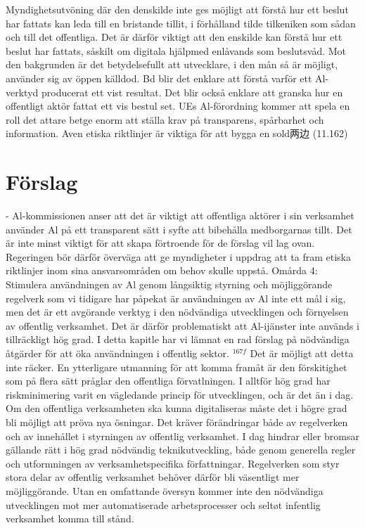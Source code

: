 {{{{{{{{{{{{{{{{Myndighetsutvöning där den denskilde inte ges möjligt att förstå hur ett beslut har fattats kan leda till en bristande tillit, i förhålland tilde tilkeniken som sådan och till det offentliga. Det är därför viktigt att den enskilde kan förstå hur ett beslut har fattats, såskilt om digitala hjälpmed enlåvands som beslutsvåd. Mot den bakgrunden är det betydelsefullt att utvecklare, i den mån så är möjligt, använder sig av öppen källdod. Bd blir det enklare att förstå varför ett Al-verktyd producerat ett vist resultat. Det blir också enklare att granska hur en offentligt aktör fattat ett vis bestul set. UEs Al-förordning kommer att spela en roll det attare betge enorm att ställa krav på transparens, spårbarhet och information. Aven etiska riktlinjer är viktiga för att bygga en sold两边 (11.162)

\section*{Förslag}
- Al-kommissionen anser att det är viktigt att offentliga aktörer i sin verksamhet använder Al på ett transparent sätt i syfte att bibehålla medborgarnas tillt. Det är inte minst viktigt för att skapa förtroende för de förslag vil lag ovan. Regeringen bör därför överväga att ge myndigheter i uppdrag att ta fram etiska riktlinjer inom sina ansvarsområden om behov skulle uppstå.
Omårda 4: Stimulera användningen av Al genom långsiktig styrning och möjliggörande regelverk som vi tidigare har påpekat är användningen av Al inte ett mål i sig, men det är ett avgörande verktyg i den nödvändiga utvecklingen och förnyelsen av offentlig verksamhet. Det är därför problematiskt att Al-ijänster inte används i tillräckligt hög grad. I detta kapitle har vi lämnat en rad förslag på nödvändiga åtgärder för att öka användningen i offentlig sektor. \({ }^{167 f}\)
Det är möjligt att detta inte räcker. En ytterligare utmanning för att komma framåt är den förskitighet som på flera sätt pråglar den offentliga förvatlningen. I alltför hög grad har riskminimering varit en vägledande princip för utvecklingen, och är det än i dag. Om den offentliga verksamheten ska kunna digitaliseras måste det i högre grad bli möjligt att pröva nya ösningar. Det kräver förändringar både av regelverken och av innehållet i styrningen av offentlig verksamhet.
I dag hindrar eller bromsar gällande rätt i hög grad nödvändig teknikutveckling, både genom generella regler och utformningen av verksamhetspecifika författningar. Regelverken som styr stora delar av offentlig verksamhet behöver därför bli väsentligt mer möjliggörande. Utan en omfattande översyn kommer inte den nödvändiga utvecklingen mot mer automatiserade arbetsprocesser och seltøt infentlig verksamhet komma till stånd.
}}}}}}}}}}}}}}}}

